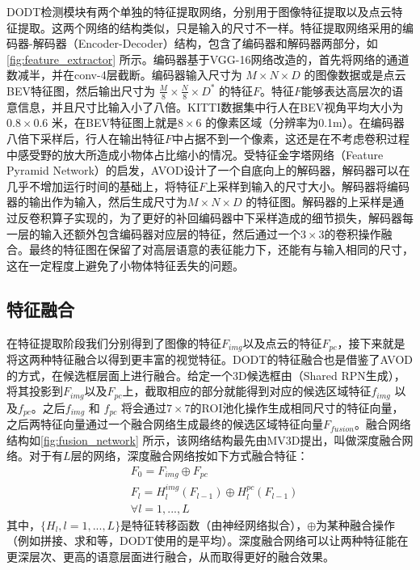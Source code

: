 DODT检测模块有两个单独的特征提取网络，分别用于图像特征提取以及点云特征提取。这两个网络的结构类似，只是输入的尺寸不一样。特征提取网络采用的编码器-解码器（Encoder-Decoder）结构，包含了编码器和解码器两部分，如\figurename \ref{fig:feature_extractor} 所示。编码器基于VGG-16网络改造的，首先将网络的通道数减半，并在conv-4层截断。编码器输入尺寸为 $M \times N \times D$ 的图像数据或是点云BEV特征图，然后输出尺寸为 $\frac{M}{8} \times \frac{N}{8} \times D^*$ 的特征$F$。特征$F$能够表达高层次的语意信息，并且尺寸比输入小了八倍。KITTI数据集中行人在BEV视角平均大小为$0.8 \times 0.6$ 米，在BEV特征图上就是$8 \times 6$ 的像素区域（分辨率为0.1m）。在编码器八倍下采样后，行人在输出特征$F$中占据不到一个像素，这还是在不考虑卷积过程中感受野的放大所造成小物体占比缩小的情况。受特征金字塔网络（Feature Pyramid Network）的启发，AVOD设计了一个自底向上的解码器，解码器可以在几乎不增加运行时间的基础上，将特征$F$上采样到输入的尺寸大小。解码器将编码器的输出作为输入，然后生成尺寸为$M \times N \times D$ 的特征图。解码器的上采样是通过反卷积算子实现的，为了更好的补回编码器中下采样造成的细节损失，解码器每一层的输入还额外包含编码器对应层的特征，然后通过一个$3 \times 3$的卷积操作融合。最终的特征图在保留了对高层语意的表征能力下，还能有与输入相同的尺寸，这在一定程度上避免了小物体特征丢失的问题。

\subsection{特征融合}



在特征提取阶段我们分别得到了图像的特征$F_{img}$以及点云的特征$F_{pc}$，接下来就是将这两种特征融合以得到更丰富的视觉特征。DODT的特征融合也是借鉴了AVOD的方式，在候选框层面上进行融合。给定一个3D候选框由（Shared RPN生成），将其投影到$F_{img}$以及$F_{pc}$上，截取相应的部分就能得到对应的候选区域特征$f_{img}$ 以及$f_{pc}$。之后$f_{img}$ 和 $f_{pc}$ 将会通过$7 \times 7$的ROI池化操作生成相同尺寸的特征向量，之后两特征向量通过一个融合网络生成最终的候选区域特征向量$F_{fusion}$。融合网络结构如\figurename \ref{fig:fusion_network} 所示，该网络结构最先由MV3D提出，叫做深度融合网络。对于有$L$层的网络，深度融合网络按如下方式融合特征：
\begin{equation}
	\begin{aligned}
		& F_0 = F_{img} \oplus F_{pc}\\
		& F_l = H^{img}_l(F_{l-1}) \oplus H^{pc}_l(F_{l-1})\\
		& \forall l = 1, ..., L
	\end{aligned}
\label{con:deep_fusion}
\end{equation}
其中，$\{H_l, l=1,...,L\}$是特征转移函数（由神经网络拟合），$\oplus$为某种融合操作（例如拼接、求和等，DODT使用的是平均）。深度融合网络可以让两种特征能在更深层次、更高的语意层面进行融合，从而取得更好的融合效果。

